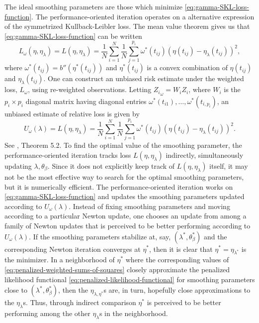 \noindent
The ideal smoothing parameters are those which minimize \eqref{eq:gamma-SKL-loss-function}. The performance-oriented iteration operates on a alternative expression of the symmetrized Kullback-Leibler loss. The mean value theorem gives us that \eqref{eq:gamma-SKL-loss-function} can be written
\begin{equation}\label{eq:gamma-SKL-loss-function-mvt}
L_\omega\left( \eta,\eta_\lambda \right) = L\left( \eta,\eta_\lambda \right) = \frac{1}{N}\sum_{i=1}^N \frac{1}{N}\sum_{j=1}^{p_i} \omega^*\left(t_{ij}\right)  \left( \eta\left(t_{ij}\right) - \eta_\lambda\left(t_{ij}\right)\right)^2,
\end{equation}
\noindent
where $\omega^*\left(t_{ij}\right) = b''\left(\eta^*\left(t_{ij}\right)\right)$ and $\eta^*\left(t_{ij}\right)$ is a convex combination of  $\eta\left(t_{ij}\right)$ and $\eta_\lambda\left(t_{ij}\right)$. One can construct an unbiased risk estimate under the weighted loss, $L_\omega$, using re-weighted observations. Letting ${Z_{i}}_\omega = W_i Z_i$, where $W_i$ is the $p_i \times p_i$ diagonal matrix having diagonal entries $\omega^*\left(t_{i1}\right), \dots, \omega^*\left(t_{i,p_i}\right)$, an unbiased estimate of relative loss is given by 
\begin{equation}\label{eq:weighted-unbiased-risk-estimate}
U_\omega\left( \lambda \right) = L\left( \eta,\eta_\lambda \right) = \frac{1}{N}\sum_{i=1}^N \frac{1}{N}\sum_{j=1}^{p_i} \omega^*\left(t_{ij}\right)  \left( \eta\left(t_{ij}\right) - \eta_\lambda\left(t_{ij}\right)\right)^2.
\end{equation}
\noindent
See \cite{gu2013smoothing}, Theorem 5.2. To find the optimal value of the smoothing parameter, the performance-oriented iteration tracks loss $L\left(\eta, \eta_\lambda \right)$ indirectly, simultaneously updating $\lambda, \theta_\beta$. Since it does not explicitly keep track of $L\left(\eta, \eta_\lambda\right)$ itself, it may not be the most effective way to search for the optimal smoothing parameters, but it is numerically efficient. The performance-oriented iteration works on \eqref{eq:gamma-SKL-loss-function} and updates the smoothing parameters updated according to $U_\omega\left( \lambda \right)$. Instead of fixing smoothing parameters and moving according to a particular Newton update, one chooses an update from among a family of Newton updates that is perceived to be better performing according to $U_\omega\left(\lambda\right)$. If the smoothing parameters stabilize at, say, $\left(\lambda^*,\theta^*_\beta\right)$ and the corresponding Newton iteration converges at $\eta^*$, then it is clear that $\eta^* = \eta_{\lambda^*}$ is the minimizer. In a neighborhood of $\eta^*$ where the corresponding values of \ref{eq:penalized-weighted-sums-of-squares} closely approximate the penalized likelihood functional \eqref{eq:penalized-likelihood-functional} for smoothing parameters close to $\left( \lambda^*, \theta^*_\beta \right)$, then the $\eta_{\lambda, \eta^*}$s are, in turn, hopefully close approximations to the $\eta_\lambda$s. Thus, through indirect comparison $\eta^*$ is perceived to be better performing among the other $\eta_\lambda$s in the neighborhood.

